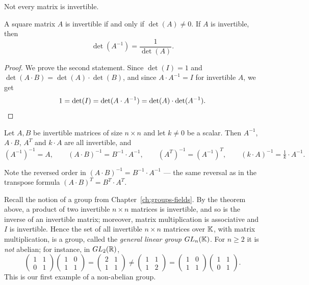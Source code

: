 \begin{warning}
Not every matrix is invertible.
\end{warning}

\begin{theorem}
A square matrix $A$ is invertible if and only if $\det(A)\neq 0$. If $A$ is invertible, then
\[
\det(A^{-1}) = \frac{1}{\det(A)}.
\]
\end{theorem}

\begin{proof}
We prove the second statement. Since $\det(I) = 1$ and $\det(A\cdot B) = \det(A)\cdot \det(B)$, and since
$A\cdot A^{-1} = I$ for invertible $A$, we get
\[
1 = \det(I) = \det(A\cdot A^{-1}) = \det(A)\cdot \det(A^{-1}). \qedhere
\]
\end{proof}

\begin{theorem}
Let $A,B$ be invertible matrices of size $n\times n$ and let $k\neq 0$ be a scalar. Then $A^{-1}$,
$A\cdot B$, $A^T$ and $k\cdot A$ are all invertible, and
\[
(A^{-1})^{-1} = A, \qquad (A\cdot B)^{-1} = B^{-1}\cdot A^{-1}, \qquad (A^T)^{-1} = (A^{-1})^T,
\qquad (k\cdot A)^{-1} = \tfrac1k\cdot A^{-1}.
\]
\end{theorem}

\begin{warning}
Note the reversed order in $(A\cdot B)^{-1} = B^{-1}\cdot A^{-1}$ — the same reversal as in the transpose
formula $(A\cdot B)^T = B^T\cdot A^T$.
\end{warning}

\begin{example}
Recall the notion of a group from Chapter~\ref{ch:groups-fields}. By the theorem above, a product of two
invertible $n\times n$ matrices is invertible, and so is the inverse of an invertible matrix; moreover,
matrix multiplication is associative and $I$ is invertible. Hence the set of all invertible $n\times n$
matrices over $\K$, with matrix multiplication, is a group, called the \emph{general linear group}
$GL_n(\K)$. For $n\geq 2$ it is \emph{not} abelian; for instance, in $GL_2(\R)$,
\[
\begin{pmatrix} 1 & 1\\ 0 & 1\end{pmatrix}
\begin{pmatrix} 1 & 0\\ 1 & 1\end{pmatrix}
=\begin{pmatrix} 2 & 1\\ 1 & 1\end{pmatrix}
\neq
\begin{pmatrix} 1 & 1\\ 1 & 2\end{pmatrix}
=\begin{pmatrix} 1 & 0\\ 1 & 1\end{pmatrix}
\begin{pmatrix} 1 & 1\\ 0 & 1\end{pmatrix}.
\]
This is our first example of a non-abelian group.
\end{example}

